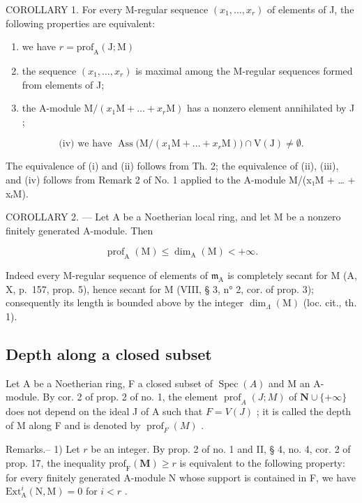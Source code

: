 COROLLARY 1. For every M-regular sequence \((x_{1},\ldots ,x_{r})\) of elements of J, the following properties are equivalent:

\begin{enumerate}
\def\labelenumi{(\roman{enumi})}
\item
  we have \(r = \mathrm{prof}_{\mathrm{A}}(\mathrm{J};\mathrm{M})\)
\item
  the sequence \((x_{1},\ldots,x_{r})\) is maximal among the M-regular sequences formed from elements of J;
\item
  the A-module \(\mathrm{M}/(x_{1}\mathrm{M}+\ldots+x_{r}\mathrm{M})\) has a nonzero element annihilated by J ;
\end{enumerate}

\[
\text {(iv)} \text {   we have   } \operatorname{Ass} \bigl (\mathrm{M} / (x _ {1} \mathrm{M} + \ldots + x _ {r} \mathrm{M}) \bigr) \cap \mathrm{V} (\mathrm{J}) \neq \emptyset .
\]

The equivalence of (i) and (ii) follows from Th. 2; the equivalence of (ii), (iii), and (iv) follows from Remark 2 of No. 1 applied to the A-module M/(x₁M + \ldots{} + xᵣM).

COROLLARY 2. --- Let A be a Noetherian local ring, and let M be a nonzero finitely generated A-module. Then

\[
\operatorname{prof} _ {\mathrm{A}} (\mathrm{M}) \leqslant \dim_ {\mathrm{A}} (\mathrm{M}) <   + \infty .
\]

Indeed every M-regular sequence of elements of \(\mathfrak{m}_{\mathrm{A}}\) is completely secant for M (A, X, p.~157, prop. 5), hence secant for M (VIII, § 3, n° 2, cor. of prop. 3); consequently its length is bounded above by the integer \(\dim_{\Lambda}(\mathrm{M})\) (loc. cit., th. 1).

\subsection{Depth along a closed subset}

Let A be a Noetherian ring, F a closed subset of \(\operatorname{Spec}(A)\) and M an A-module. By cor. 2 of prop. 2 of no. 1, the element \(\operatorname{prof}_{A}(J;M)\) of \(\mathbf{N} \cup \{+\infty\}\) does not depend on the ideal J of A such that \(F = V(J)\) ; it is called the depth of M along F and is denoted by \(\operatorname{prof}_{F}(M)\) .

Remarks.-- 1) Let \(r\) be an integer. By prop. 2 of no. 1 and II, § 4, no. 4, cor. 2 of prop. 17, the inequality \(\mathrm{prof}_{\mathrm{F}}(\mathbf{M}) \geqslant r\) is equivalent to the following property: for every finitely generated A-module N whose support is contained in F, we have \(\mathrm{Ext}_{\mathrm{A}}^{i}(\mathrm{N},\mathrm{M}) = 0\) for \(i < r\) .

